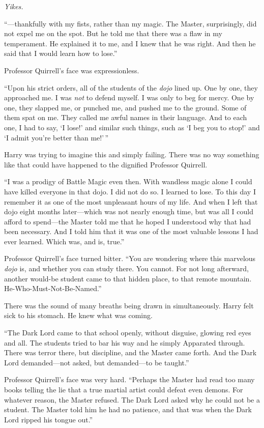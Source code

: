 \emph{Yikes.}

``---thankfully with my fists, rather than my magic. The Master,
surprisingly, did not expel me on the spot. But he told me that there
was a flaw in my temperament. He explained it to me, and I knew that he
was right. And then he said that I would learn how to lose.''

Professor Quirrell's face was expressionless.

``Upon his strict orders, all of the students of the \emph{dojo} lined
up. One by one, they approached me. I was \emph{not} to defend myself. I
was only to beg for mercy. One by one, they slapped me, or punched me,
and pushed me to the ground. Some of them spat on me. They called me
awful names in their language. And to each one, I had to say, `I lose!'
and similar such things, such as `I beg you to stop!' and `I admit
you're better than me!'\,''

Harry was trying to imagine this and simply failing. There was no way
something like that could have happened to the dignified Professor
Quirrell.

``I was a prodigy of Battle Magic even then. With wandless magic alone I
could have killed everyone in that dojo. I did not do so. I learned to
lose. To this day I remember it as one of the most unpleasant hours of
my life. And when I left that dojo eight months later---which was not
nearly enough time, but was all I could afford to spend---the Master
told me that he hoped I understood why that had been necessary. And I
told him that it was one of the most valuable lessons I had ever
learned. Which was, and is, true.''

Professor Quirrell's face turned bitter. ``You are wondering where this
marvelous \emph{dojo} is, and whether you can study there. You cannot.
For not long afterward, another would-be student came to that hidden
place, to that remote mountain. He-Who-Must-Not-Be-Named.''

There was the sound of many breaths being drawn in simultaneously. Harry
felt sick to his stomach. He knew what was coming.

``The Dark Lord came to that school openly, without disguise, glowing
red eyes and all. The students tried to bar his way and he simply
Apparated through. There was terror there, but discipline, and the
Master came forth. And the Dark Lord demanded---not asked, but
demanded---to be taught.''

Professor Quirrell's face was very hard. ``Perhaps the Master had read
too many books telling the lie that a true martial artist could defeat
even demons. For whatever reason, the Master refused. The Dark Lord
asked why he could not be a student. The Master told him he had no
patience, and that was when the Dark Lord ripped his tongue out.''

